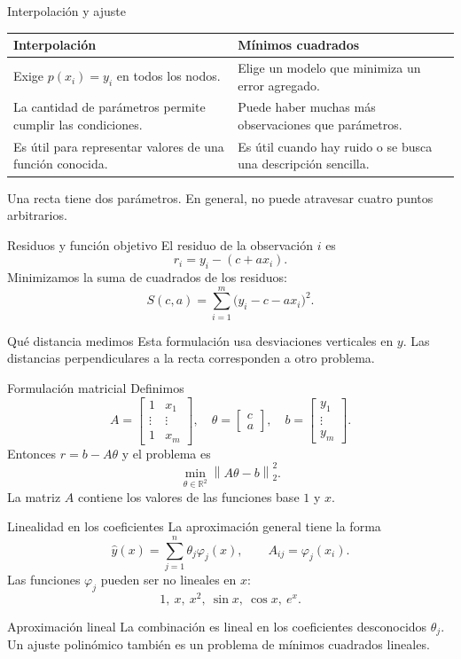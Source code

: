 \documentclass[aspectratio=169,12pt]{beamer}
\newcommand{\R}{\mathbb{R}}
\newcommand{\mat}[1]{\begin{bmatrix}#1\end{bmatrix}}
\newcommand{\norm}[1]{\left\lVert#1\right\rVert}
\begin{document}
\begin{frame}{Interpolación y ajuste}
\begin{center}\begin{tabular}{p{5.5cm}p{5.5cm}}\toprule
Interpolación & Mínimos cuadrados\\\midrule
Exige $p(x_i)=y_i$ en todos los nodos. & Elige un modelo que minimiza un error agregado.\\[2mm]
La cantidad de parámetros permite cumplir las condiciones. & Puede haber muchas más observaciones que parámetros.\\[2mm]
Es útil para representar valores de una función conocida. & Es útil cuando hay ruido o se busca una descripción sencilla.\\\bottomrule
\end{tabular}\end{center}
Una recta tiene dos parámetros. En general, no puede atravesar cuatro puntos arbitrarios.
\end{frame}

\begin{frame}{Residuos y función objetivo}
El residuo de la observación $i$ es
\[
r_i=y_i-(c+ax_i).
\]
Minimizamos la suma de cuadrados de los residuos:
\[
S(c,a)=\sum_{i=1}^m\bigl(y_i-c-ax_i\bigr)^2.
\]
\begin{block}{Qué distancia medimos}
Esta formulación usa desviaciones verticales en $y$. Las distancias
perpendiculares a la recta corresponden a otro problema.
\end{block}
\end{frame}

\begin{frame}{Formulación matricial}
Definimos
\[
A=\mat{1&x_1\\\vdots&\vdots\\1&x_m},
\quad \theta=\mat{c\\a},\quad b=\mat{y_1\\\vdots\\y_m}.
\]
Entonces $r=b-A\theta$ y el problema es
\[
\boxed{\min_{\theta\in\R^2}\norm{A\theta-b}_2^2.}
\]
La matriz $A$ contiene los valores de las funciones base $1$ y $x$.
\end{frame}

\begin{frame}{Linealidad en los coeficientes}
La aproximación general tiene la forma
\[
\widehat y(x)=\sum_{j=1}^n\theta_j\varphi_j(x),
\qquad A_{ij}=\varphi_j(x_i).
\]
Las funciones $\varphi_j$ pueden ser no lineales en $x$:
\[
1,\ x,\ x^2,\ \sin x,\ \cos x,\ e^x.
\]
\begin{block}{Aproximación lineal}
La combinación es lineal en los coeficientes desconocidos $\theta_j$.
Un ajuste polinómico también es un problema de mínimos cuadrados lineales.
\end{block}
\end{frame}
\end{document}
